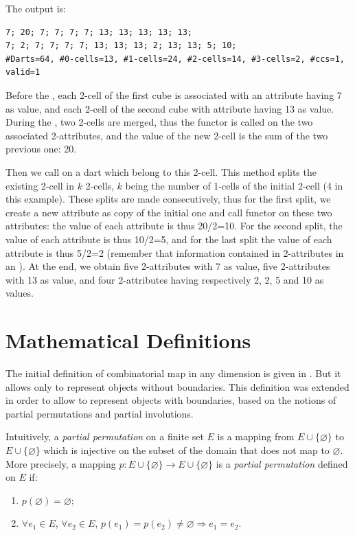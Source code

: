 The output is:
\begin{verbatim}
7; 20; 7; 7; 7; 7; 13; 13; 13; 13; 13; 
7; 2; 7; 7; 7; 7; 13; 13; 13; 2; 13; 13; 5; 10; 
#Darts=64, #0-cells=13, #1-cells=24, #2-cells=14, #3-cells=2, #ccs=1, valid=1
\end{verbatim}

Before the , each 2-cell of the first cube is
associated with an attribute having 7 as value, and each 2-cell of the
second cube with attribute having 13 as value. During the
, two 2-cells are merged, thus the functor
 is called on the two associated 2-attributes, and
the value of the new 2-cell is the sum of the two previous one: 20.

Then we call  on a dart which
belong to this 2-cell. This method splits the existing 2-cell in $k$
2-cells, $k$ being the number of 1-cells of the initial 2-cell (4 in
this example). These splits are made consecutively, thus for the first
split, we create a new attribute as copy of the initial one and call
functor  on these two attributes: the value
of each attribute is thus 20/2=10. For the second split, the value of
each attribute is thus 10/2=5, and for the last split the value of
each attribute is thus 5/2=2 (remember that information contained in
2-attributes in an ).  At the end, we obtain five
2-attributes with 7 as value, five 2-attributes with 13 as value, and
four 2-attributes having respectively 2, 2, 5 and 10 as values.

\section{Mathematical Definitions}\label{sec_definition}
The initial definition of combinatorial map in any dimension is given
in \cite{cgal:l-tmbrc-91,l-ndgcm-94}. But it allows only to represent
objects without boundaries. This definition was extended
\cite{cgal:pabl-cco-07,cgal:d-ccccg-10} in order to allow to represent 
objects with boundaries, based on the notions of partial permutations 
and partial involutions.

Intuitively, a \emph{partial permutation} on a finite set $E$ is a
mapping from $E\cup\{\varnothing\}$ to $E\cup\{\varnothing\}$ which is
injective on the subset of the domain that does not map to
$\varnothing$.  More precisely, a mapping $p:E \cup \{\varnothing\}
\rightarrow E \cup \{\varnothing\}$ is a \emph{partial permutation}
defined on $E$ if:
\begin{enumerate}
\item $p(\varnothing)=\varnothing$;
\item $\forall e_1 \in E$, $\forall e_2 \in E$,
  $p(e_1)=p(e_2)\neq \varnothing \Rightarrow e_1=e_2$.
\end{enumerate}

